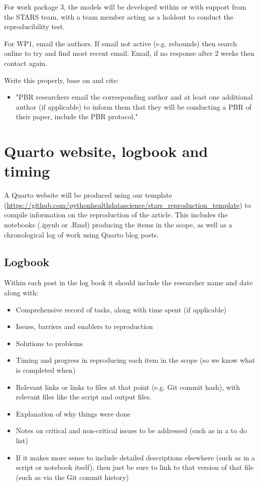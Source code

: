 For work package 3, the models will be developed within or with support from the STARS team, with a team member acting as a holdout to conduct the reproducibility test.

For WP1, email the authors. If email not active (e.g. rebounds) then search online to try and find most recent email. Email, if no response after 2 weeks then contact again.

Write this properly, base on and cite:
\begin{itemize}
    \item "PBR researchers email the corresponding author and at least one additional author (if applicable) to inform them that they will be conducting a PBR of their paper, include the PBR protocol,"\autocite{berkeley_initiative_for_transparency_in_the_social_sciences_guide_2022}
\end{itemize}

\section{Quarto website, logbook and timing}

A Quarto website will be produced using our template (\url{https://github.com/pythonhealthdatascience/stars_reproduction_template}) to compile information on the reproduction of the article. This includes the notebooks (.ipynb or .Rmd) producing the items in the scope, as well as a chronological log of work using Quarto blog posts.

\subsection{Logbook}

Within each post in the log book it should include the researcher name and date along with:
\begin{itemize}
    \item Comprehensive record of tasks, along with time spent (if applicable)
    \item Issues, barriers and enablers to reproduction
    \item Solutions to problems
    \item Timing and progress in reproducing each item in the scope (so we know what is completed when)
    \item Relevant links or links to files at that point (e.g. Git commit hash), with relevant files like the script and output files.
    \item Explanation of why things were done
    \item Notes on critical and non-critical issues to be addressed (such as in a to do list)
    \item If it makes more sense to include detailed descriptions elsewhere (such as in a script or notebook itself), then just be sure to link to that version of that file (such as via the Git commit history)
\end{itemize}

